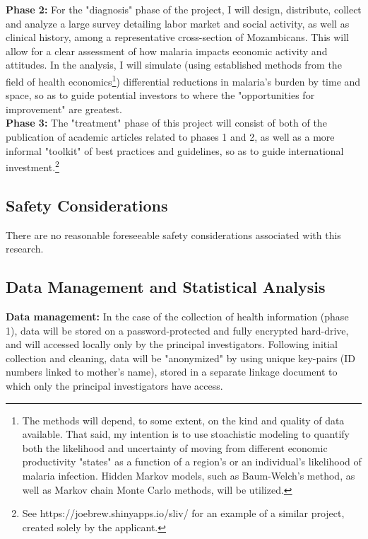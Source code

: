 \documentclass{article}
\begin{document}
\begin{multicols}{2}
\noindent \textbf{Phase 2:} For the "diagnosis" phase of the project, I will design, distribute, collect and analyze a large survey detailing labor market and social activity, as well as clinical history, among a representative cross-section of Mozambicans.  This will allow for a clear assessment of how malaria impacts economic activity and attitudes.  In the analysis, I will simulate (using established methods from the field of health economics\footnote{The methods will depend, to some extent, on the kind and quality of data available.  That said, my intention is to use stoachistic modeling to quantify both the likelihood and uncertainty of moving from different economic productivity "states" as a function of a region's or an individual's likelihood of malaria infection.  Hidden Markov models, such as Baum-Welch's method, as well as Markov chain Monte Carlo methods, will be utilized.}) differential reductions in malaria's burden by time and space, so as to guide potential investors to where the "opportunities for improvement" are greatest. \\

\noindent \textbf{Phase 3:} The "treatment" phase of this project will consist of both of the publication of academic articles related to phases 1 and 2, as well as a more informal "toolkit" of best practices and guidelines, so as to guide international investment.\footnote{See https://joebrew.shinyapps.io/sliv/ for an example of a similar project, created solely by the applicant. }  



\subsection*{Safety Considerations}

There are no reasonable foreseeable safety considerations associated with this research.  


\subsection*{Data Management and Statistical Analysis}

\noindent \textbf{Data management:} In the case of the collection of health information (phase 1), data will be stored on a password-protected and fully encrypted hard-drive, and will accessed locally only by the principal investigators.  Following initial collection and cleaning, data will be "anonymized" by using unique key-pairs (ID numbers linked to mother's name), stored in a separate linkage document to which only the principal investigators have access. \\ 


\end{multicols}
\end{document}
